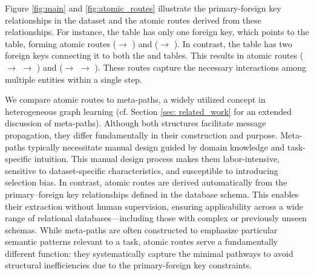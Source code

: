 \documentclass{article}
\theoremstyle{plain}
\theoremstyle{definition}
\theoremstyle{remark}
\begin{document}
Figure \ref{fig:main} and \ref{fig:atomic_routes} illustrate the primary-foreign key relationships in the \fone dataset and the atomic routes derived from these relationships. For instance, the \circuits table has only one foreign key, which points to the \race table, forming atomic routes (\circuits $\to$ \race) and (\race $\to$ \circuits). In contrast, the \standing table has two foreign keys connecting it to both the \driver and \race tables. This results in atomic routes (\driver $\to$ \standing $\to$ \race) and (\race $\to$ \standing $\to$ \driver). These routes capture the necessary interactions among multiple entities within a single step.


We compare atomic routes to meta-paths, a widely utilized concept in heterogeneous graph learning (cf. Section \ref{sec: related_work} for an extended discussion of meta-paths). Although both structures facilitate message propagation, they differ fundamentally in their construction and purpose. Meta-paths typically necessitate manual design guided by domain knowledge and task-specific intuition. This manual design process makes them labor-intensive, sensitive to dataset-specific characteristics, and susceptible to introducing selection bias. In contrast, atomic routes are derived automatically from the primary–foreign key relationships defined in the database schema. This enables their extraction without human supervision, ensuring applicability across a wide range of relational databases—including those with complex or previously unseen schemas.
While meta-paths are often constructed to emphasize particular semantic patterns relevant to a task, atomic routes serve a fundamentally different function: they systematically capture the minimal pathways to avoid structural inefficiencies due to the primary-foreign key constraints. 
\end{document}
